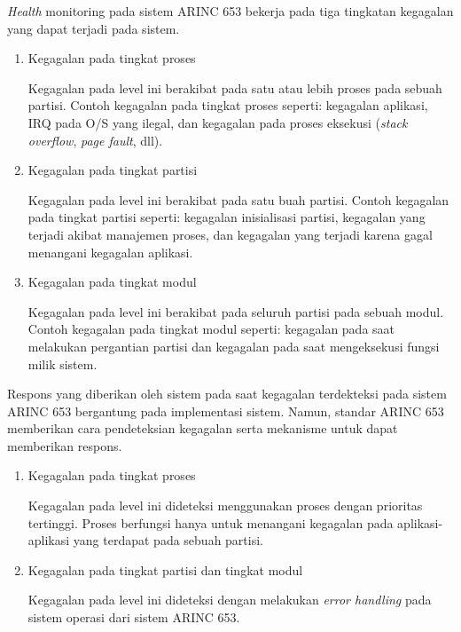 \textit{Health} monitoring pada sistem ARINC 653 bekerja pada tiga tingkatan kegagalan yang
dapat terjadi pada sistem.

\begin{enumerate}

	\item Kegagalan pada tingkat proses

		Kegagalan pada level ini berakibat pada satu atau lebih proses pada sebuah
		partisi. Contoh kegagalan pada tingkat proses seperti: kegagalan aplikasi, IRQ
		pada O/S yang ilegal, dan kegagalan pada proses eksekusi (\textit{stack
		overflow}, \textit{page fault}, dll).

	\item Kegagalan pada tingkat partisi

		Kegagalan pada level ini berakibat pada satu buah partisi. Contoh kegagalan pada
		tingkat partisi seperti: kegagalan inisialisasi partisi, kegagalan yang terjadi
		akibat manajemen proses, dan kegagalan yang terjadi karena gagal menangani
		kegagalan aplikasi.

	\item Kegagalan pada tingkat modul

		Kegagalan pada level ini berakibat pada seluruh partisi pada sebuah modul.
		Contoh kegagalan pada tingkat modul seperti: kegagalan pada saat melakukan
		pergantian partisi dan kegagalan pada saat mengeksekusi fungsi milik sistem.

\end{enumerate}

Respons yang diberikan oleh sistem pada saat kegagalan terdekteksi pada sistem ARINC 653
bergantung pada implementasi sistem. Namun, standar ARINC 653 memberikan cara pendeteksian
kegagalan serta mekanisme untuk dapat memberikan respons.
\begin{enumerate}
	\item Kegagalan pada tingkat proses

		Kegagalan pada level ini dideteksi menggunakan proses dengan prioritas
		tertinggi. Proses berfungsi hanya untuk menangani kegagalan pada
		aplikasi-aplikasi yang terdapat pada sebuah partisi.

	\item Kegagalan pada tingkat partisi dan tingkat modul

		Kegagalan pada level ini dideteksi dengan melakukan \textit{error handling} pada
		sistem operasi dari sistem ARINC 653.

\end{enumerate}

